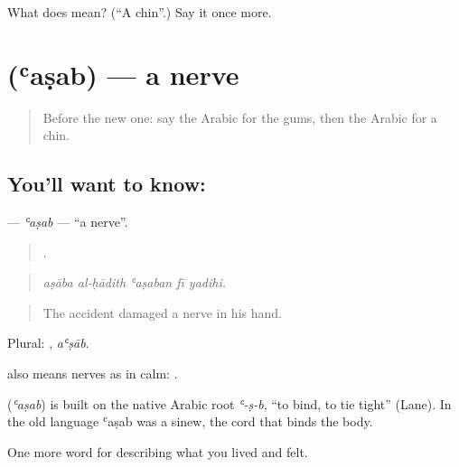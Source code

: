 \begin{tcolorbox}[breakable,colback=teal!4,colframe=teal!35!black,title={Before you move on}]
What does  mean? (\textquotedblleft{}A chin\textquotedblright{}.) Say it once more.
\end{tcolorbox}
\section[\texorpdfstring{\ar{عصب} (ʿaṣab)}{عصب (ʿaṣab)}]{ (ʿaṣab) — a nerve}

\label{lesson:AR-C506-asab}



\begin{quote}
Before the new one: say the Arabic for the gums, then the Arabic for a chin.
\end{quote}

\subsection*{You'll want to know: }
\textbf{} — \emph{ʿaṣab} — \textquotedblleft{}a nerve\textquotedblright{}.

\begin{quote}
    .
\end{quote}

\begin{quote}
\emph{aṣāba al-ḥādith ʿaṣaban fī yadihi.}
\end{quote}

\begin{quote}
The accident damaged a nerve in his hand.
\end{quote}

Plural: , \emph{aʿṣāb}.

 also means nerves as in calm:  .

\begin{cousinweb}
\textbf{} (\emph{ʿaṣab}) is built on the native Arabic root \emph{ʿ-ṣ-b}, \textquotedblleft{}to bind, to tie tight\textquotedblright{} (Lane). In the old language ʿaṣab was a sinew, the cord that binds the body.
\end{cousinweb}

\begin{grammarlens}[title={What you've built}]
One more word for describing what you lived and felt.
\end{grammarlens}

